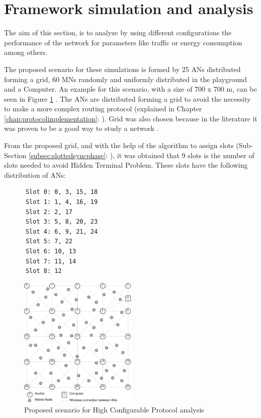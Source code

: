 \section{Framework simulation and analysis}

The aim of this section, is to analyze by using different configurations the performance of the network for parameters like traffic or energy 
consumption among others.

The proposed scenario for these simulations is formed by 25 \acp{AN} distributed forming a grid, 60 \acp{MN} randomly and uniformly distributed in the
playground and a Computer. An example for this scenario, with a size of 700 x 700 m, can be seen in Figure \ref{fig:finalscenario} . The \acp{AN} 
are distributed forming a grid to avoid the necessity to make a more complex routing protocol (explained in Chapter \ref{chap:protocolimplementation}: 
). Grid was also chosen because in the literature it was proven to be a good way to study a network \cite{GridNetworks}.

From the proposed grid, and with the help of the algorithm to assign slots (Sub-Section \ref{subsec:slottedsyncphase}: 
), it was obtained that 9 slots is the number of slots needed to avoid Hidden Terminal Problem. These slots have the 
following distribution of \acp{AN}:

\begin{verbatim}
      Slot 0: 0, 3, 15, 18
      Slot 1: 1, 4, 16, 19
      Slot 2: 2, 17
      Slot 3: 5, 8, 20, 23
      Slot 4: 6, 9, 21, 24
      Slot 5: 7, 22
      Slot 6: 10, 13
      Slot 7: 11, 14
      Slot 8: 12
\end{verbatim}

\begin{figure}[ht]
 \begin{center}
  \includegraphics[width=0.5\textwidth]{finalscenario.eps}
 \end{center}
 \caption{Proposed scenario for High Configurable Protocol analysis}
 \label{fig:finalscenario}
\end{figure}


